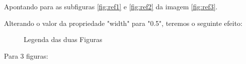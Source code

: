             Apontando para as subfiguras \ref{fig:ref1} e \ref{fig:ref2} da imagem \ref{fig:ref3}.


            Alterando o valor da propriedade "width" para "0.5", teremos o seguinte efeito:
            \begin{figure}[H]
                \centering
                \hfill
                \caption{Legenda das duas Figuras}
                \label{fig:ref6}
            \end{figure}      

            Para 3 figuras:
        
